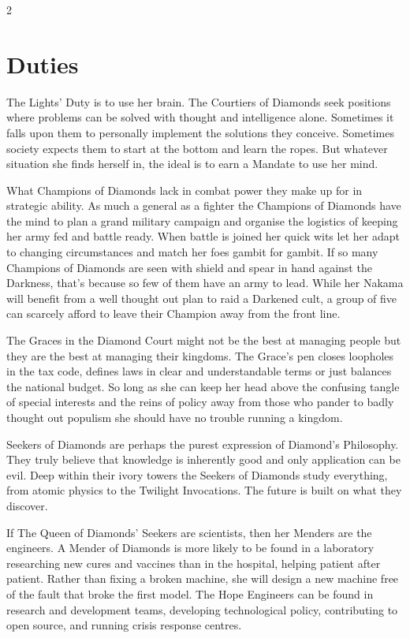 \begin{multicols}{2}
\section*{Duties}
The Lights' Duty is to use her brain. The Courtiers of Diamonds seek positions where problems can be solved with thought and intelligence alone. Sometimes it falls upon them to personally implement the solutions they conceive. Sometimes society expects them to start at the bottom and learn the ropes. But whatever situation she finds herself in, the ideal is to earn a Mandate to use her mind.

What Champions of Diamonds lack in combat power they make up for in strategic ability. As much a general as a fighter the Champions of Diamonds have the mind to plan a grand military campaign and organise the logistics of keeping her army fed and battle ready. When battle is joined her quick wits let her adapt to changing circumstances and match her foes gambit for gambit. If so many Champions of Diamonds are seen with shield and spear in hand against the Darkness, that's because so few of them have an army to lead. While her Nakama will benefit from a well thought out plan to raid a Darkened cult, a group of five can scarcely afford to leave their Champion away from the front line.

The Graces in the Diamond Court might not be the best at managing people but they are the best at managing their kingdoms. The Grace's pen closes loopholes in the tax code, defines laws in clear and understandable terms or just balances the national budget. So long as she can keep her head above the confusing tangle of special interests and the reins of policy away from those who pander to badly thought out populism she should have no trouble running a kingdom.

Seekers of Diamonds are perhaps the purest expression of Diamond's Philosophy. They truly believe that knowledge is inherently good and only application can be evil. Deep within their ivory towers the Seekers of Diamonds study everything, from atomic physics to the Twilight Invocations. The future is built on what they discover.

If The Queen of Diamonds' Seekers are scientists, then her Menders are the engineers. A Mender of Diamonds is more likely to be found in a laboratory researching new cures and vaccines than in the hospital, helping patient after patient. Rather than fixing a broken machine, she will design a new machine free of the fault that broke the first model. The Hope Engineers can be found in research and development teams, developing technological policy, contributing to open source, and running crisis response centres.


\end{multicols}
